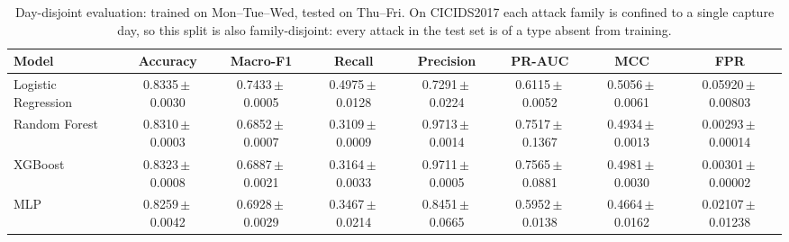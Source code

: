 \begin{table}[htbp]
\centering
\caption{Day-disjoint evaluation: trained on Mon--Tue--Wed, tested on Thu--Fri. On CICIDS2017 each attack family is confined to a single capture day, so this split is also family-disjoint: every attack in the test set is of a type absent from training.}
\label{tab:daydisjoint}
\scriptsize
\begin{tabular}{lccccccc}
\hline
Model & Accuracy & Macro-F1 & Recall & Precision & PR-AUC & MCC & FPR \\
\hline
Logistic Regression & 0.8335\,$\pm$\,0.0030 & 0.7433\,$\pm$\,0.0005 & 0.4975\,$\pm$\,0.0128 & 0.7291\,$\pm$\,0.0224 & 0.6115\,$\pm$\,0.0052 & 0.5056\,$\pm$\,0.0061 & 0.05920\,$\pm$\,0.00803 \\
Random Forest & 0.8310\,$\pm$\,0.0003 & 0.6852\,$\pm$\,0.0007 & 0.3109\,$\pm$\,0.0009 & 0.9713\,$\pm$\,0.0014 & 0.7517\,$\pm$\,0.1367 & 0.4934\,$\pm$\,0.0013 & 0.00293\,$\pm$\,0.00014 \\
XGBoost & 0.8323\,$\pm$\,0.0008 & 0.6887\,$\pm$\,0.0021 & 0.3164\,$\pm$\,0.0033 & 0.9711\,$\pm$\,0.0005 & 0.7565\,$\pm$\,0.0881 & 0.4981\,$\pm$\,0.0030 & 0.00301\,$\pm$\,0.00002 \\
MLP & 0.8259\,$\pm$\,0.0042 & 0.6928\,$\pm$\,0.0029 & 0.3467\,$\pm$\,0.0214 & 0.8451\,$\pm$\,0.0665 & 0.5952\,$\pm$\,0.0138 & 0.4664\,$\pm$\,0.0162 & 0.02107\,$\pm$\,0.01238 \\
\hline
\end{tabular}
\end{table}

